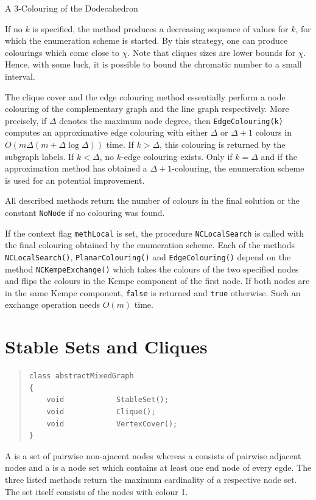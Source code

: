 \documentclass[a4paper,11pt,twoside]{book}
\begin{document}
\begin{multicols}{2}
\bigskip
\begin{figurehere}
\begin{center}
\epsfxsize=8cm
\vspace{0.5cm}
\caption{\label{flb_dodeka}A $3$-Colouring of the Dodecahedron}
\end{center}
\end{figurehere}

\noindent
If no $k$ is specified, the method produces a decreasing sequence of values for
$k$, for which the enumeration scheme is started. By this strategy, one can
produce colourings which come close to $\chi$. Note that cliques sizes are lower
bounds for $\chi$. Hence, with some luck, it is possible to bound the chromatic
number to a small interval.

The clique cover and the edge colouring method essentially perform a node
colouring of the complementary graph and the line graph respectively. More
precisely, if $\Delta$ denotes the maximum node degree, then
\verb/EdgeColouring(k)/ computes an approximative edge colouring with either
$\Delta$ or $\Delta+1$ colours in $O(m\Delta(m+\Delta\log{\Delta}))$ time. If
$k>\Delta$, this colouring is returned by the subgraph labels. If $k<\Delta$,
no $k$-edge colouring exists. Only if $k=\Delta$ and if the approximation
method has obtained a $\Delta+1$-colouring, the enumeration scheme is used for
an potential improvement.

All described methods return the number of colours in the final solution or
the constant \verb/NoNode/ if no colouring was found.
 
If the context flag \verb/methLocal/ is set, the procedure \verb/NCLocalSearch/
is called with the final colouring obtained by the enumeration scheme. Each of
the methods \verb/NCLocalSearch()/, \verb/PlanarColouring()/ and \verb/EdgeColouring()/
depend on the method \verb/NCKempeExchange()/ which takes the colours of the two
specified nodes and flips the colours in the Kempe component of the first node.
If both nodes are in the same Kempe component, \verb/false/ is returned and
\verb/true/ otherwise. Such an exchange operation needs $O(m)$ time.




\section{Stable Sets and Cliques}
\label{slb_solve_stable}
\methods
\begin{quote}
\begin{verbatim}
class abstractMixedGraph
{
    void            StableSet();
    void            Clique();
    void            VertexCover();
}
\end{verbatim}
\end{quote}
A  is a set of pairwise non-ajacent nodes whereas a 
consists of pairwise adjacent nodes and a  is a node set which
contains at least one end node of every egde. The three listed methods return
the maximum cardinality of a respective node set. The set itself consists of
the nodes with colour 1.


\end{multicols}
\end{document}
